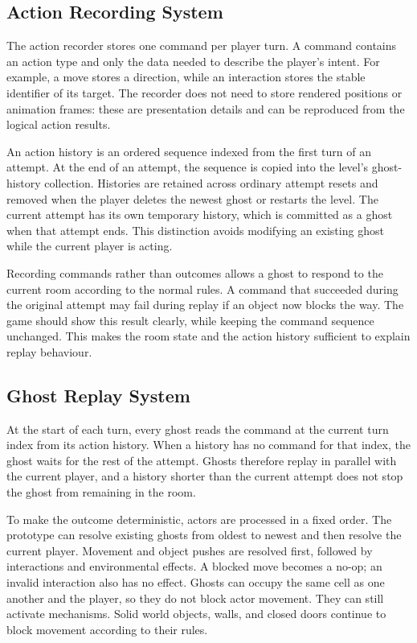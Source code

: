 \subsection{Action Recording System}

The action recorder stores one command per player turn. A command contains an action type and only the data needed to describe the player's intent. For example, a move stores a direction, while an interaction stores the stable identifier of its target. The recorder does not need to store rendered positions or animation frames: these are presentation details and can be reproduced from the logical action results.

An action history is an ordered sequence indexed from the first turn of an attempt. At the end of an attempt, the sequence is copied into the level's ghost-history collection. Histories are retained across ordinary attempt resets and removed when the player deletes the newest ghost or restarts the level. The current attempt has its own temporary history, which is committed as a ghost when that attempt ends. This distinction avoids modifying an existing ghost while the current player is acting.

Recording commands rather than outcomes allows a ghost to respond to the current room according to the normal rules. A command that succeeded during the original attempt may fail during replay if an object now blocks the way. The game should show this result clearly, while keeping the command sequence unchanged. This makes the room state and the action history sufficient to explain replay behaviour.

\subsection{Ghost Replay System}

At the start of each turn, every ghost reads the command at the current turn index from its action history. When a history has no command for that index, the ghost waits for the rest of the attempt. Ghosts therefore replay in parallel with the current player, and a history shorter than the current attempt does not stop the ghost from remaining in the room.

To make the outcome deterministic, actors are processed in a fixed order. The prototype can resolve existing ghosts from oldest to newest and then resolve the current player. Movement and object pushes are resolved first, followed by interactions and environmental effects. A blocked move becomes a no-op; an invalid interaction also has no effect. Ghosts can occupy the same cell as one another and the player, so they do not block actor movement. They can still activate mechanisms. Solid world objects, walls, and closed doors continue to block movement according to their rules.

